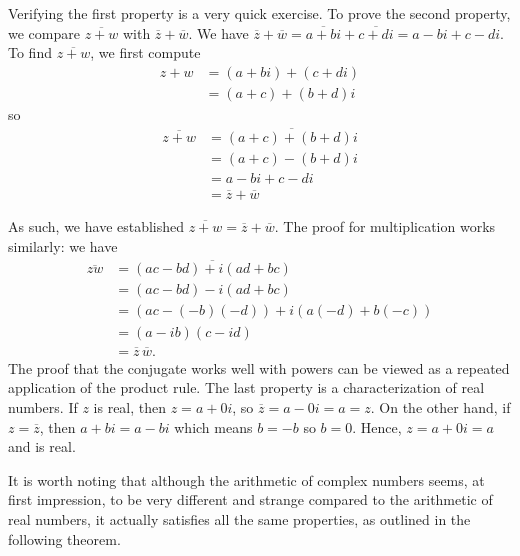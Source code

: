 Verifying the first property is a very quick exercise.  To prove the second property, we compare $\overline{z+w}$ with $\overline{z} + \overline{w}$.  We have $\overline{z} + \overline{w} = \overline{a+bi} + \overline{c+di}  = a-bi + c-di$.  To find $\overline{z+w}$, we first compute 
\begin{align*}
z+w &= (a+bi) + (c+di)\\
& = (a+c)+(b+d)i
\end{align*}
 so 
\begin{align*}
 \overline{z+w} &= \overline{(a+c)+(b+d)i}\\
  & = (a+c) - (b+d)i\\
  & = a - bi + c - di\\
  & = \overline{z} + \overline{w}
\end{align*}
 
 As such, we have established  $\overline{z+w} = \overline{z}+\overline{w}$. The proof for multiplication works similarly: we have
 \begin{align*}
 \overline{zw}& = \overline{(ac-bd)+i(ad+bc)}\\
  & = (ac-bd)-i(ad+bc)\\
  & = (ac-(-b)(-d))+i(a(-d)+b(-c))\\
  & = (a-ib)(c-id)\\
  & = \overline{z}\,\overline{w}.
 \end{align*} 
   The proof that the conjugate works well with powers can be viewed as a repeated application of the product rule.   The last property is a characterization of real numbers.  If $z$ is real, then $z = a + 0i$, so $\overline{z} = a - 0i = a = z$.  On the other hand, if $z=\overline{z}$, then $a+bi = a - bi$ which means $b=-b$ so $b=0$.  Hence, $z = a +0i = a$ and is real.


\medskip

It is worth noting that although the arithmetic of complex numbers seems, at first impression, to be very different and strange compared to the arithmetic of real numbers, it actually satisfies all the same properties, as outlined in the following theorem.


